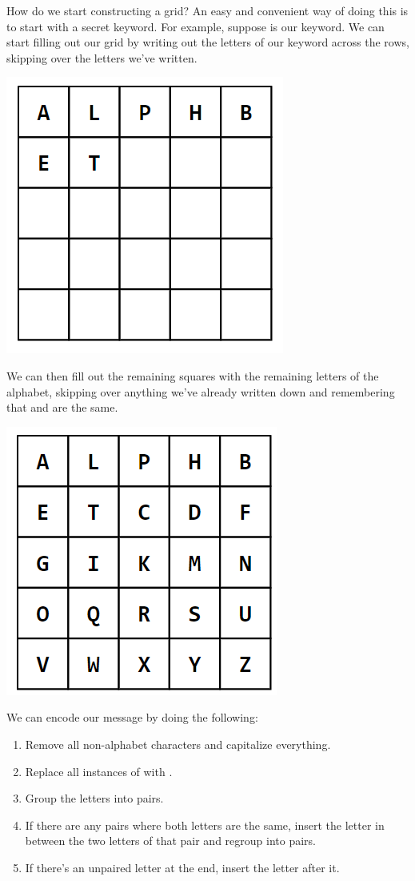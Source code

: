 \documentclass[letterpaper]{article}
\newcommand{\0}{\mathbf{0}}
\begin{document}
How do we start constructing a grid? An easy and convenient way of doing this is to start with a secret keyword. For example, suppose  is our keyword. We can start filling out our grid by writing out the letters of our keyword across the rows, skipping over the letters we've written.
\begin{center}
    \includegraphics[scale=0.5]{assets/playfair_1.png}
\end{center}
We can then fill out the remaining squares with the remaining letters of the alphabet, skipping over anything we've already written down and remembering that  and  are the same. 
\begin{center}
    \includegraphics[scale=0.5]{assets/playfair_2.png}
\end{center}
We can encode our message by doing the following: 
\begin{enumerate}
    \item Remove all non-alphabet characters and capitalize everything.
    \item Replace all instances of  with . 
    \item Group the letters into pairs. 
    \item If there are any pairs where both letters are the same, insert the letter  in between the two letters of that pair and regroup into pairs. 
    \item If there's an unpaired letter at the end, insert the letter  after it.
\end{enumerate}
\end{document}
